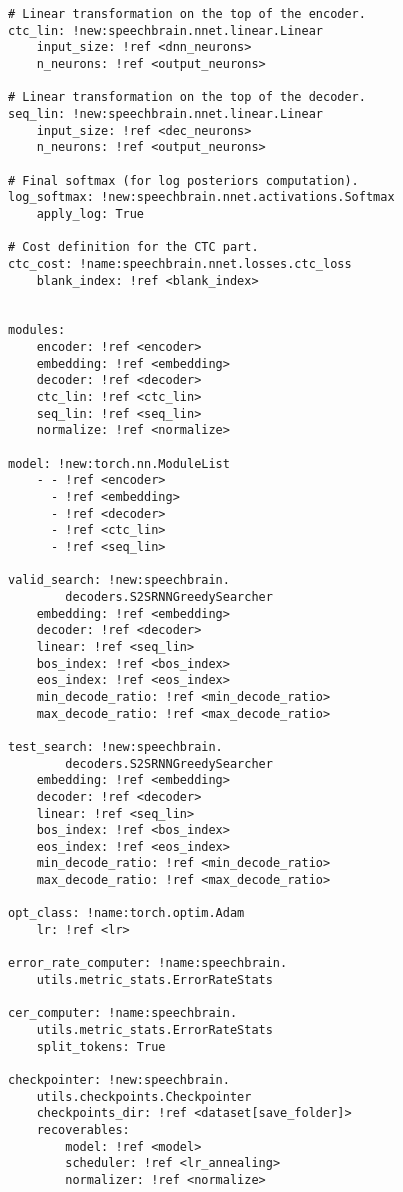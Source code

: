 \begin{verbatim}
# Linear transformation on the top of the encoder.
ctc_lin: !new:speechbrain.nnet.linear.Linear
    input_size: !ref <dnn_neurons>
    n_neurons: !ref <output_neurons>

# Linear transformation on the top of the decoder.
seq_lin: !new:speechbrain.nnet.linear.Linear
    input_size: !ref <dec_neurons>
    n_neurons: !ref <output_neurons>

# Final softmax (for log posteriors computation).
log_softmax: !new:speechbrain.nnet.activations.Softmax
    apply_log: True

# Cost definition for the CTC part.
ctc_cost: !name:speechbrain.nnet.losses.ctc_loss
    blank_index: !ref <blank_index>


modules:
    encoder: !ref <encoder>
    embedding: !ref <embedding>
    decoder: !ref <decoder>
    ctc_lin: !ref <ctc_lin>
    seq_lin: !ref <seq_lin>
    normalize: !ref <normalize>

model: !new:torch.nn.ModuleList
    - - !ref <encoder>
      - !ref <embedding>
      - !ref <decoder>
      - !ref <ctc_lin>
      - !ref <seq_lin>

valid_search: !new:speechbrain.
        decoders.S2SRNNGreedySearcher
    embedding: !ref <embedding>
    decoder: !ref <decoder>
    linear: !ref <seq_lin>
    bos_index: !ref <bos_index>
    eos_index: !ref <eos_index>
    min_decode_ratio: !ref <min_decode_ratio>
    max_decode_ratio: !ref <max_decode_ratio>

test_search: !new:speechbrain.
        decoders.S2SRNNGreedySearcher
    embedding: !ref <embedding>
    decoder: !ref <decoder>
    linear: !ref <seq_lin>
    bos_index: !ref <bos_index>
    eos_index: !ref <eos_index>
    min_decode_ratio: !ref <min_decode_ratio>
    max_decode_ratio: !ref <max_decode_ratio>

opt_class: !name:torch.optim.Adam
    lr: !ref <lr>

error_rate_computer: !name:speechbrain.
    utils.metric_stats.ErrorRateStats

cer_computer: !name:speechbrain.
    utils.metric_stats.ErrorRateStats
    split_tokens: True

checkpointer: !new:speechbrain.
    utils.checkpoints.Checkpointer
    checkpoints_dir: !ref <dataset[save_folder]>
    recoverables:
        model: !ref <model>
        scheduler: !ref <lr_annealing>
        normalizer: !ref <normalize>
\end{verbatim}



